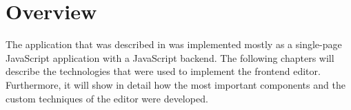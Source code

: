 \section{Overview}

The application that was described in  was implemented mostly as a single-page JavaScript application with a JavaScript backend. The following chapters will describe the technologies that were used to implement the frontend editor. Furthermore, it will show in detail how the most important components and the custom techniques of the editor were developed.